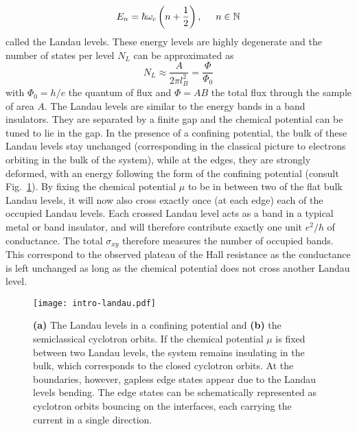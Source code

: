 \begin{equation}
E_n = \hbar \omega_c \left( n + \frac{1}{2} \right), \hspace*{0.5cm } n \in \mathbb{N}
\end{equation}
called the Landau levels. These energy levels are highly degenerate and the number of states per level $N_L$ can be approximated as
\begin{equation}
N_L \approx \frac{A}{2 \pi l_B^2 } = \frac{\Phi}{\Phi_0}
\end{equation}
with $\Phi_0 = h /e$ the quantum of flux and $\Phi = A B$ the total flux through the sample of area $A$. The Landau levels are similar to the energy bands in a band insulators. They are separated by a finite gap and the chemical potential can be tuned to lie in the gap. In the presence of a confining potential, the bulk of these Landau levels stay unchanged (corresponding in the classical picture to electrons orbiting in the bulk of the system), while at the edges, they are strongly deformed, with an energy following the form of the confining potential (consult Fig.~\ref{fig:LL}). By fixing the chemical potential $\mu$ to be in between two of the flat bulk Landau levels, it will now also cross exactly once (at each edge) each of the occupied Landau levels. Each crossed Landau level acts as a band in a typical metal or band insulator, and will therefore contribute exactly one unit $e^2/h$ of conductance. The total $\sigma_{xy}$ therefore measures the number of occupied bands. This correspond to the observed plateau of the Hall resistance as the conductance is left unchanged as long as the chemical potential does not cross another Landau level. 

\begin{figure}
\centering
\texttt{[image: intro-landau.pdf]}
\caption[The Landau levels in the confining potential and the semiclassical orbits]{\textbf{(a)} The Landau levels in a confining potential and \textbf{(b)} the semiclassical cyclotron orbits. If the chemical potential $\mu$ is fixed between two Landau levels, the system remains insulating in the bulk, which corresponds to the closed cyclotron orbits. At the boundaries, however, gapless edge states appear due to the Landau levels bending. The edge states can be schematically represented as cyclotron orbits bouncing on the interfaces, each carrying the current in a single direction.}
\label{fig:LL}
\end{figure}

